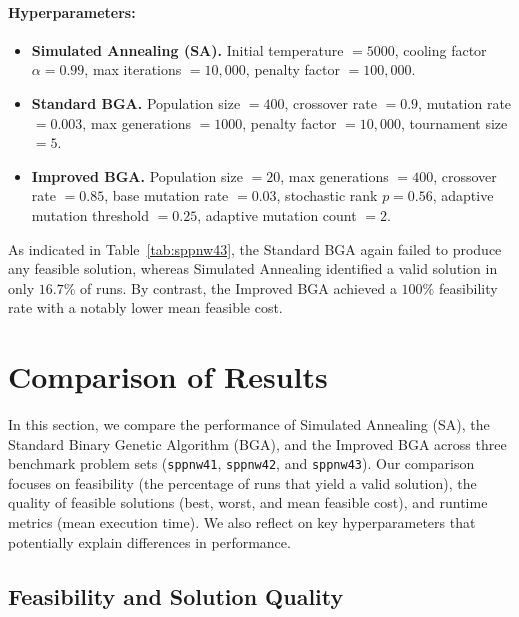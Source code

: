 \documentclass[12pt]{article}
\begin{document}
\paragraph{Hyperparameters:}
\vspace{-1em}
\begin{itemize}
    \item \textbf{Simulated Annealing (SA).}
    Initial temperature $= 5000$, 
    cooling factor $\alpha = 0.99$, 
    max iterations $= 10{,}000$, 
    penalty factor $= 100{,}000$. 
    
    \item \textbf{Standard BGA.}
    Population size $= 400$, 
    crossover rate $= 0.9$, 
    mutation rate $= 0.003$, 
    max generations $= 1000$, 
    penalty factor $= 10{,}000$, 
    tournament size $= 5$. 
    
    \item \textbf{Improved BGA.}
    Population size $= 20$, 
    max generations $= 400$, 
    crossover rate $= 0.85$, 
    base mutation rate $= 0.03$, 
    stochastic rank $p = 0.56$, 
    adaptive mutation threshold $= 0.25$, 
    adaptive mutation count $= 2$.
\end{itemize}

\noindent
As indicated in Table~\ref{tab:sppnw43}, the Standard BGA again failed to produce any feasible solution, whereas Simulated Annealing identified a valid solution in only $16.7\%$ of runs. By contrast, the Improved BGA achieved a $100\%$ feasibility rate with a notably lower mean feasible cost.

\section{Comparison of Results}
\label{sec:comparison}

In this section, we compare the performance of Simulated Annealing (SA), the Standard Binary Genetic Algorithm (BGA), and the Improved BGA across three benchmark problem sets (\texttt{sppnw41}, \texttt{sppnw42}, and \texttt{sppnw43}). Our comparison focuses on feasibility (the percentage of runs that yield a valid solution), the quality of feasible solutions (best, worst, and mean feasible cost), and runtime metrics (mean execution time). We also reflect on key hyperparameters that potentially explain differences in performance.

\subsection{Feasibility and Solution Quality}
\end{document}
